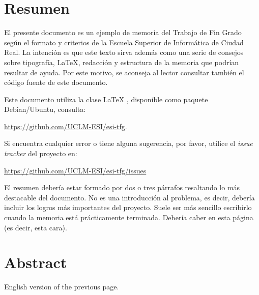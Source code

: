 \chapter{Resumen}

El presente documento es un ejemplo de memoria del Trabajo de Fin Grado según el
formato y criterios de la Escuela Superior de Informática de Ciudad Real. La
intención es que este texto sirva además como una serie de consejos sobre
tipografía, \LaTeX, redacción y estructura de la memoria que podrían resultar de
ayuda. Por este motivo, se aconseja al lector consultar también el código fuente
de este documento.

Este documento utiliza la clase \LaTeX{} \esitfg{}, disponible como paquete
Debian/Ubuntu, consulta:

 \url{https://github.com/UCLM-ESI/esi-tfg}.

Si encuentra cualquier error o tiene alguna sugerencia, por favor, utilice
el \emph{issue tracker} del proyecto \esitfg{} en:

\url{https://github.com/UCLM-ESI/esi-tfg/issues}

El resumen debería estar formado por dos o tres párrafos resaltando lo más
destacable del documento. No es una introducción al problema, es decir, debería
incluir los logros más importantes del proyecto. Suele ser más sencillo
escribirlo cuando la memoria está prácticamente terminada. Debería caber en esta
página (es decir, esta cara).


\chapter{Abstract}

English version of the previous page.
